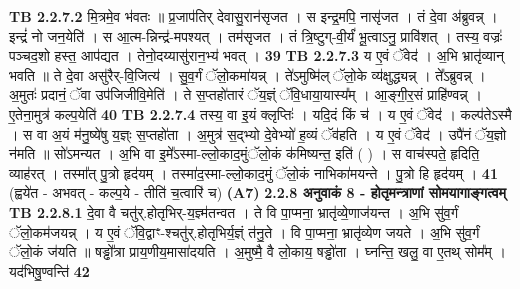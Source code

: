 \documentclass[17pt]{extarticle}
\begin{document}
                                \textbf{ TB 2.2.7.2} \newline
                  मि॒त्रमे॒व भ॑वतः ॥ प्र॒जाप॑तिर् देवासु॒रान॑सृजत । स इन्द्र॒मपि॒ नासृ॑जत । तं दे॒वा अ॑ब्रुवन्न् । इन्द्रं॑ नो जन॒येति॑ । स आ॒त्म-न्निन्द्र॑-मपश्यत् । तम॑सृजत । तं त्रि॒ष्टुग्-वी॒र्यं॑ भू॒त्वाऽनु॒ प्रावि॑शत् । तस्य॒ वज्रः॑ पञ्चद॒शो हस्त॒ आप॑द्यत । तेनो॒दय्यासु॑रान॒भ्य॑ भवत् । \textbf{ 39} \newline
                  \newline
                                \textbf{ TB 2.2.7.3} \newline
                  य ए॒वं ॅवेद॑ । अ॒भि भ्रातृ॑व्यान् भवति ॥ ते दे॒वा असु॑रैर्-वि॒जित्य॑ । सु॒व॒र्गं ॅलो॒कमा॑यन्न् । ते॑ऽमुष्मि॑ल् ॅलो॒के व्य॑क्षुद्ध्यन्न् । ते᳚ऽब्रुवन्न् । अ॒मुतः॑ प्रदानं॒ ॅवा उप॑जिजीवि॒मेति॑ । ते स॒प्तहो॑तारं ॅय॒ज्ञ्ं ॅवि॒धाया॒यास्य᳚म् । आ॒ङ्गी॒र॒सं प्राहि॑ण्वन्न् । ए॒तेना॒मुत्र॑ कल्प॒येति॑ \textbf{ 40} \newline
                  \newline
                                \textbf{ TB 2.2.7.4} \newline
                  तस्य॒ वा इ॒यं क्लृप्तिः॑ । यदि॒दं किं च॑ । य ए॒वं ॅवेद॑ । कल्प॑तेऽस्मै । स वा अ॒यं म॑नु॒ष्ये॑षु य॒ज्ञ्ः स॒प्तहो॑ता । अ॒मुत्र॑ स॒द्भ्यो दे॒वेभ्यो॑ ह॒व्यं ॅव॑हति । य ए॒वं ॅवेद॑ । उपै॑नं ॅय॒ज्ञो न॑मति ॥ सो॑ऽमन्यत । अ॒भि वा इ॒मे᳚ऽस्मा-ल्लो॒काद॒मुंॅलो॒कं क॑मिष्यन्त॒ इति॑ ( ) । स वाच॑स्पते॒ हृदिति॒ व्याह॑रत् । तस्मा᳚त् पु॒त्रो हृद॑यम् । तस्मा॑द॒स्मा-ल्लो॒काद॒मुं ॅलो॒कं नाभिका॑मयन्ते । पु॒त्रो हि हृद॑यम् । \textbf{ 41} \newline
                  \newline
                                    (ह्वये॑त - अभवत् - कल्प॒ये - तीति॑ च॒त्वारि॑ च) \textbf{(A7)} \newline \newline
                \textbf{ 2.2.8     अनुवाकं   8 - होतृमन्त्राणां सोमयागाङ्गत्वम्} \newline
                                \textbf{ TB 2.2.8.1} \newline
                  दे॒वा वै चतु॑र्.होतृभिर्-य॒ज्ञ्म॑तन्वत । ते वि पा॒प्मना॒ भ्रातृ॑व्ये॒णाज॑यन्त । अ॒भि सु॑व॒र्गं ॅलो॒कम॑जयन्न् । य ए॒वं ॅवि॒द्वाꣳ-श्चतु॑र्.होतृभिर्य॒ज्ञ्ं त॑नु॒ते । वि पा॒प्मना॒ भ्रातृ॑व्येण जयते । अ॒भि सु॑व॒र्गं ॅलो॒कं ज॑यति ॥ षड्ढो᳚त्रा प्राय॒णीय॒मासा॑दयति । अ॒मुष्मै॒ वै लो॒काय॒ षड्ढो॑ता । घ्नन्ति॒ खलु॒ वा ए॒तथ् सोम᳚म् । यद॑भिषु॒ण्वन्ति॑ \textbf{ 42} \newline
                  \newline
\end{document}
